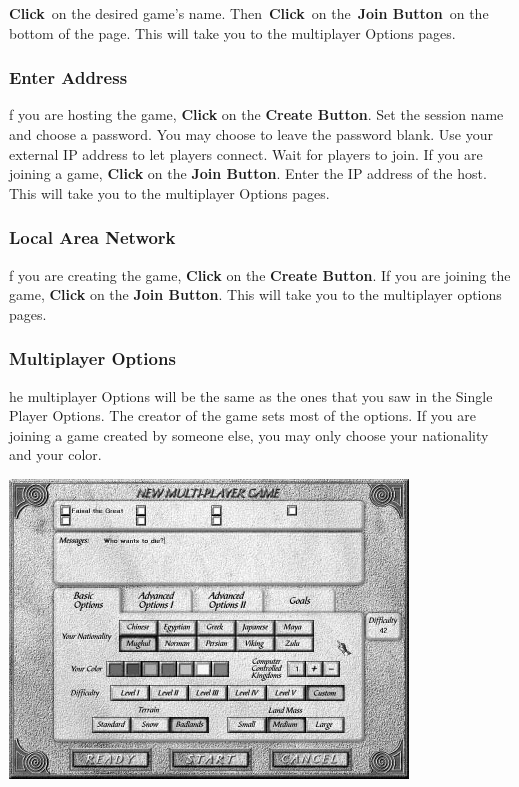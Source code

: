 \textbf{Click} on the desired game’s name. Then \textbf{Click} on the \textbf{Join Button} on the bottom of the page. This will take you to the multiplayer Options pages.

\subsubsection{Enter Address}

f you are hosting the game, \textbf{Click} on the \textbf{Create Button}. Set the session name and choose a password. You may choose to leave the password blank. Use your external IP address to let players connect. Wait for players to join. If you are joining a game, \textbf{Click} on the \textbf{Join Button}. Enter the IP address of the host. This will take you to the multiplayer Options pages.

\subsubsection{Local Area Network}

f you are creating the game, \textbf{Click} on the \textbf{Create Button}. If you are joining the game, \textbf{Click} on the \textbf{Join Button}. This will take you to the multiplayer options pages.

\subsubsection{Multiplayer Options}

he multiplayer Options will be the same as the ones that you saw in the Single Player Options. The creator of the game sets most of the options. If you are joining a game created by someone else, you may only choose your nationality and your color.

\begin{center}
	\includegraphics[width=0.7\linewidth]{Imultiplayer3}
\end{center}


